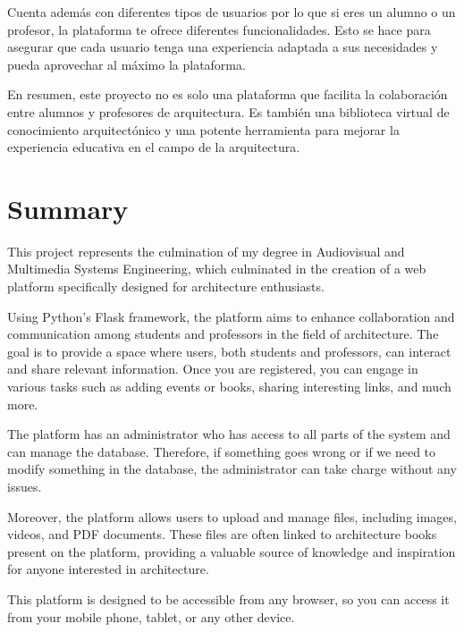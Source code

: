 \documentclass[a4paper, 12pt]{book}
\begin{document}
Cuenta además con diferentes tipos de usuarios por lo que si eres un alumno o un profesor, la plataforma te ofrece diferentes funcionalidades. 
Esto se hace para asegurar que cada usuario tenga una experiencia adaptada a sus necesidades y pueda aprovechar al máximo la plataforma.

En resumen, este proyecto no es solo una plataforma que facilita la colaboración entre alumnos y profesores de arquitectura. Es también 
una biblioteca virtual de conocimiento arquitectónico y una potente herramienta para mejorar la experiencia educativa en el campo de la 
arquitectura.


\chapter*{Summary}

This project represents the culmination of my degree in Audiovisual and Multimedia Systems Engineering, 
which culminated in the creation of a web platform specifically designed for architecture enthusiasts.

Using Python's Flask framework, the platform aims to enhance collaboration and communication among students 
and professors in the field of architecture. The goal is to provide a space where users, both students and professors, 
can interact and share relevant information. Once you are registered, you can engage in various tasks such as adding events 
or books, sharing interesting links, and much more.

The platform has an administrator who has access to all parts of the system and can manage the database. Therefore, if 
something goes wrong or if we need to modify something in the database, the administrator can take charge without any issues.

Moreover, the platform allows users to upload and manage files, including images, videos, and PDF documents. These files are 
often linked to architecture books present on the platform, providing a valuable source of knowledge and inspiration for anyone 
interested in architecture.

This platform is designed to be accessible from any browser, so you can access it from your mobile phone, tablet, or any other device.
\end{document}
